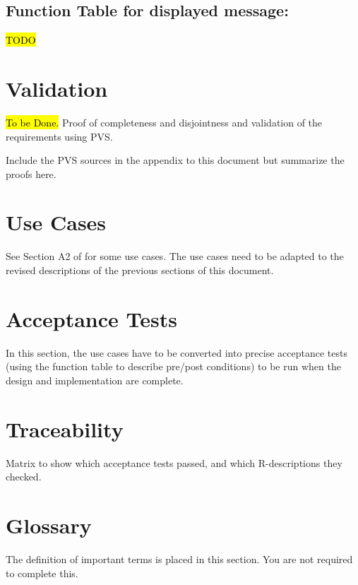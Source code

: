 \documentclass[fontsize=12pt,paper=letter,twoside]{scrartcl}
\begin{document}
\subsection{Function Table for displayed message: }
\hl{TODO}

\section{Validation}
\hl{To be Done.}
Proof of completeness and disjointness and validation of the requirements using PVS.

Include the PVS sources in the appendix to this document but summarize the proofs here.

\section{Use Cases}
See Section A2 of \cite{REMH} for some use cases. The use cases need to be adapted to the revised descriptions of the previous sections of this document.

\section{Acceptance Tests}
In this section, the use cases have to be converted into precise acceptance tests (using the function table to describe pre/post conditions) to be run when the design and implementation are complete.

\section{Traceability}
Matrix to show which acceptance tests passed, and which R-descriptions they checked.

\section{Glossary}
The definition of important terms is placed in this section. You are not required to complete this.



\end{document}
